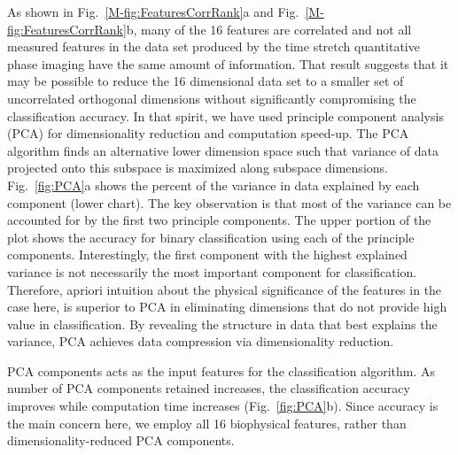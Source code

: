 \documentclass[aps,pra,reprint,longbibliography,groupedaddress]{revtex4-1}
\begin{document}
As shown in Fig.~\ref{M-fig:FeaturesCorrRank}a and Fig.~\ref{M-fig:FeaturesCorrRank}b, many of the 16 features are correlated and not all measured features in the data set produced by the time stretch quantitative phase imaging have the same amount of information. That result suggests that it may be possible to reduce the 16 dimensional data set to a smaller set of uncorrelated orthogonal dimensions without significantly compromising the classification accuracy. In that spirit, we have used principle component analysis (PCA) for dimensionality reduction and computation speed-up. The PCA algorithm finds an alternative lower dimension space such that variance of data projected onto this subspace is maximized along subspace dimensions. Fig.~\ref{fig:PCA}a shows the percent of the variance in data explained by each component (lower chart). The key observation is that most of the variance can be accounted for by the first two principle components. The upper portion of the plot shows the accuracy for binary classification using each of the principle components. Interestingly, the first component with the highest explained variance is not necessarily the most important component for classification. Therefore, apriori intuition about the physical significance of the features in the case here, is superior to PCA in eliminating dimensions that do not provide high value in classification. By revealing the structure in data that best explains the variance, PCA achieves data compression via dimensionality reduction. 

PCA components acts as the input features for the classification algorithm. As number of PCA components retained increases, the classification accuracy improves while computation time increases (Fig.~\ref{fig:PCA}b). Since accuracy is the main concern here, we employ all 16 biophysical features, rather than dimensionality-reduced PCA components.
\end{document}
